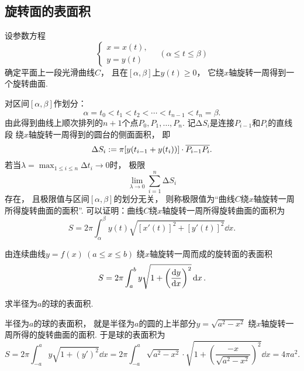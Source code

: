 \subsection{旋转面的表面积}
设参数方程\[
	\left\{ \begin{array}{l}
		x = x(t), \\
		y = y(t)
	\end{array} \right.
	\quad(\alpha \leq t \leq \beta)
\]确定平面上一段光滑曲线\(C\)，
且在\([\alpha,\beta]\)上\(y(t) \geq 0\)，
它绕\(x\)轴旋转一周得到一个旋转曲面.

对区间\([\alpha,\beta]\)作划分：\[
	\alpha = t_0 < t_1 < t_2 < \dotsb < t_{n-1} < t_n = \beta.
\]
由此得到曲线上顺次排列的\(n+1\)个点\(P_0,P_1,\dotsc,P_n\).
记\(\increment S_i\)是连接\(P_{i-1}\)和\(P_i\)的直线段
绕\(x\)轴旋转一周得到的圆台的侧面面积，
即\[
	\Delta S_i
	:=
	\pi [y(t_{i-1} + y(t_i))] \cdot \overline{P_{i-1} P_i}.
\]
若当\(\lambda=\max_{1 \leq i \leq n} \increment t_i \to 0\)时，
极限\[
	\lim_{\lambda\to0} \sum_{i=1}^n \increment S_i
\]存在，
且极限值与区间\([\alpha,\beta]\)的划分无关，
则称极限值为“曲线\(C\)绕\(x\)轴旋转一周所得旋转曲面的面积”.
可以证明：曲线\(C\)绕\(x\)轴旋转一周所得旋转曲面的面积为\begin{equation}
	S = 2\pi \int_\alpha^\beta y(t) \sqrt{[x'(t)]^2 + [y'(t)]^2} \dd{x}.
\end{equation}

\begin{theorem}[古尔丁表面积定理]
由连续曲线\(y=f(x)\ (a \leq x \leq b)\)
绕\(x\)轴旋转一周而成的旋转面的表面积\begin{equation}
	S = 2\pi \int_a^b y \sqrt{1+\left(\dv{y}{x}\right)^2} \dd{x}.
\end{equation}
\end{theorem}

\begin{example}
求半径为\(a\)的球的表面积.
\begin{solution}
半径为\(a\)的球的表面积，
就是半径为\(a\)的圆的上半部分\(y=\sqrt{a^2-x^2}\)
绕\(x\)轴旋转一周所得的旋转曲面的面积.
于是球的表面积为\[
	S = 2\pi \int_{-a}^a y \sqrt{1+(y')^2} \dd{x}
	= 2\pi \int_{-a}^a \sqrt{a^2-x^2} \cdot
		\sqrt{1+\left(\frac{-x}{\sqrt{a^2-x^2}}\right)^2} \dd{x}
	= 4\pi a^2.
\]
\end{solution}
\end{example}

